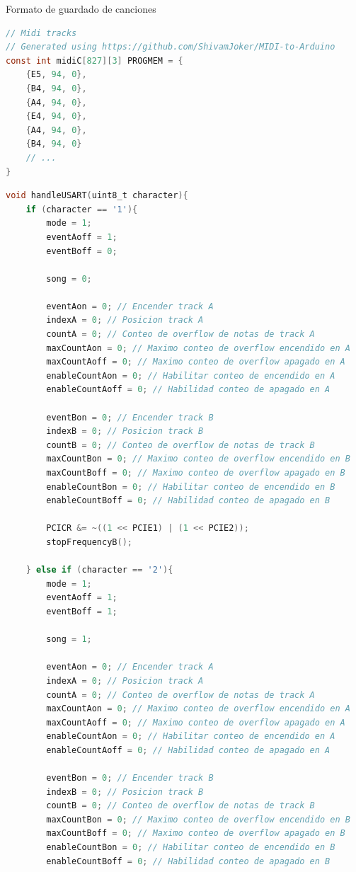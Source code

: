 Formato de guardado de canciones
\begin{lstlisting}[language=C, caption={Guardado de canciones}]
// Midi tracks
// Generated using https://github.com/ShivamJoker/MIDI-to-Arduino
const int midiC[827][3] PROGMEM = {
	{E5, 94, 0},
	{B4, 94, 0},
	{A4, 94, 0},
	{E4, 94, 0},
	{A4, 94, 0},
	{B4, 94, 0}
    // ... 
}
\end{lstlisting}

\begin{lstlisting}[language=C, caption={Manejo de eventos RX USART}]
void handleUSART(uint8_t character){
	if (character == '1'){
		mode = 1;
		eventAoff = 1;
		eventBoff = 0;
		
		song = 0;
		
		eventAon = 0; // Encender track A
		indexA = 0; // Posicion track A
		countA = 0; // Conteo de overflow de notas de track A
		maxCountAon = 0; // Maximo conteo de overflow encendido en A
		maxCountAoff = 0; // Maximo conteo de overflow apagado en A
		enableCountAon = 0; // Habilitar conteo de encendido en A
		enableCountAoff = 0; // Habilidad conteo de apagado en A
		
		eventBon = 0; // Encender track B
		indexB = 0; // Posicion track B
		countB = 0; // Conteo de overflow de notas de track B
		maxCountBon = 0; // Maximo conteo de overflow encendido en B
		maxCountBoff = 0; // Maximo conteo de overflow apagado en B
		enableCountBon = 0; // Habilitar conteo de encendido en B
		enableCountBoff = 0; // Habilidad conteo de apagado en B
		
		PCICR &= ~((1 << PCIE1) | (1 << PCIE2));
		stopFrequencyB();
		
	} else if (character == '2'){
		mode = 1;
		eventAoff = 1;
		eventBoff = 1;
		
		song = 1;
		
		eventAon = 0; // Encender track A
		indexA = 0; // Posicion track A
		countA = 0; // Conteo de overflow de notas de track A
		maxCountAon = 0; // Maximo conteo de overflow encendido en A
		maxCountAoff = 0; // Maximo conteo de overflow apagado en A
		enableCountAon = 0; // Habilitar conteo de encendido en A
		enableCountAoff = 0; // Habilidad conteo de apagado en A
		
		eventBon = 0; // Encender track B
		indexB = 0; // Posicion track B
		countB = 0; // Conteo de overflow de notas de track B
		maxCountBon = 0; // Maximo conteo de overflow encendido en B
		maxCountBoff = 0; // Maximo conteo de overflow apagado en B
		enableCountBon = 0; // Habilitar conteo de encendido en B
		enableCountBoff = 0; // Habilidad conteo de apagado en B
		

\end{lstlisting}
